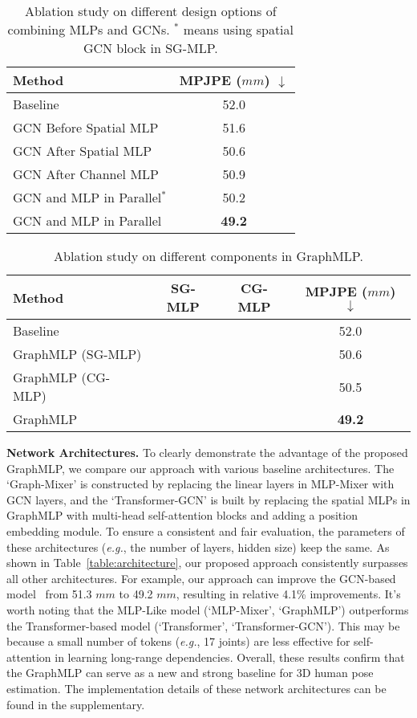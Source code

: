 \documentclass[lettersize,journal]{IEEEtran}
\newcommand{\cmark}{\ding{51}}
\newcommand{\xmark}{\ding{55}}
\begin{document}
\begin{table}[t]
  \centering
  \caption
  {
    Ablation study on different design options of combining MLPs and GCNs. 
    $^{*}$ means using spatial GCN block in SG-MLP. 
  }
  \setlength{\tabcolsep}{5.80mm}
  \begin{tabular}{lc}
  \toprule
  Method &MPJPE ($mm$) $\downarrow$ \\
  \midrule
  Baseline &52.0 \\
  \midrule
  GCN Before Spatial MLP &51.6 \\
  GCN After Spatial MLP &50.6 \\
  GCN After Channel MLP &50.9 \\
  GCN and MLP in Parallel$^{*}$ &50.2 \\
  GCN and MLP in Parallel &\textbf{49.2} \\
  \toprule
  \end{tabular}
  \label{table:design}
\end{table}

\begin{table}[t]
  \centering
  \caption
  {
    Ablation study on different components in GraphMLP. 
  }
  \setlength{\tabcolsep}{2.00mm}
  \begin{tabular}{l|cc|c}
  \toprule
  Method& SG-MLP& CG-MLP& MPJPE ($mm$) $\downarrow$ \\
  \midrule
  Baseline &\xmark &
  \xmark &52.0 \\
  \midrule
  GraphMLP (SG-MLP) &\cmark &\xmark& 50.6 \\
  GraphMLP (CG-MLP) &\xmark &\cmark &50.5 \\
  GraphMLP &\cmark &\cmark &\textbf{49.2} \\

  \toprule
  \end{tabular}
  \label{table:components}
\end{table}

\noindent \textbf{Network Architectures.}
To clearly demonstrate the advantage of the proposed GraphMLP, we compare our approach with various baseline architectures. 
The `Graph-Mixer' is constructed by replacing the linear layers in MLP-Mixer with GCN layers, and the `Transformer-GCN' is built by replacing the spatial MLPs in GraphMLP with multi-head self-attention blocks and adding a position embedding module. 
To ensure a consistent and fair evaluation, the parameters of these architectures (\emph{e.g.}, the number of layers, hidden size) keep the same. 
As shown in Table~\ref{table:architecture}, our proposed approach consistently surpasses all other architectures. 
For example, our approach can improve the GCN-based model~\cite{stgcn} from 51.3 $mm$ to 49.2 $mm$, resulting in relative 4.1\% improvements. 
It's worth noting that the MLP-Like model (`MLP-Mixer', `GraphMLP') outperforms the Transformer-based model (`Transformer', `Transformer-GCN'). 
This may be because a small number of tokens (\emph{e.g.}, 17 joints) are less effective for self-attention in learning long-range dependencies. 
Overall, these results confirm that the GraphMLP can serve as a new and strong baseline for 3D human pose estimation. 
The implementation details of these network architectures can be found in the supplementary. 
\end{document}
